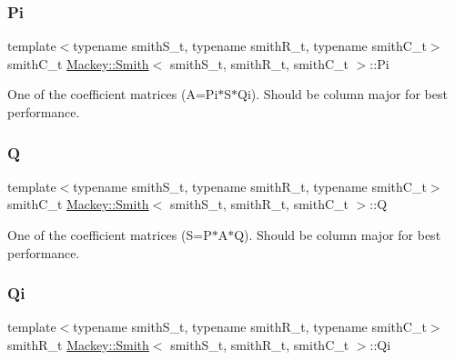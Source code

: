 \mbox{\label{classMackey_1_1Smith_a97f16eca1aa9f4f6c36c2680fdcf277e}} 
\subsubsection{\texorpdfstring{Pi}{Pi}}
{\footnotesize\ttfamily template$<$typename smith\+S\+\_\+t, typename smith\+R\+\_\+t, typename smith\+C\+\_\+t$>$ \\
smith\+C\+\_\+t \hyperlink{classMackey_1_1Smith}{Mackey\+::\+Smith}$<$ smith\+S\+\_\+t, smith\+R\+\_\+t, smith\+C\+\_\+t $>$\+::Pi}



One of the coefficient matrices (A=Pi$\ast$\+S$\ast$\+Qi). Should be column major for best performance. 

\mbox{\label{classMackey_1_1Smith_af93f16dfd0ce77406d9696a026092306}} 
\subsubsection{\texorpdfstring{Q}{Q}}
{\footnotesize\ttfamily template$<$typename smith\+S\+\_\+t, typename smith\+R\+\_\+t, typename smith\+C\+\_\+t$>$ \\
smith\+C\+\_\+t \hyperlink{classMackey_1_1Smith}{Mackey\+::\+Smith}$<$ smith\+S\+\_\+t, smith\+R\+\_\+t, smith\+C\+\_\+t $>$\+::Q}



One of the coefficient matrices (S=P$\ast$\+A$\ast$Q). Should be column major for best performance. 

\mbox{\label{classMackey_1_1Smith_ade9f9fbe25629c7e20bc9cfe69ee91ad}} 
\subsubsection{\texorpdfstring{Qi}{Qi}}
{\footnotesize\ttfamily template$<$typename smith\+S\+\_\+t, typename smith\+R\+\_\+t, typename smith\+C\+\_\+t$>$ \\
smith\+R\+\_\+t \hyperlink{classMackey_1_1Smith}{Mackey\+::\+Smith}$<$ smith\+S\+\_\+t, smith\+R\+\_\+t, smith\+C\+\_\+t $>$\+::Qi}



